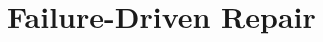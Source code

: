 \documentclass[
11pt, %
oneside, %
english, %
singlespacing, %
headsepline, %
]{MastersDoctoralThesis} %
\theoremstyle{plain}
\theoremstyle{definition}
\theoremstyle{remark}
\theoremstyle{remark}
\theoremstyle{plain}
\theoremstyle{plain}
\begin{document}

\chapter{Failure-Driven Repair}
\end{document}
